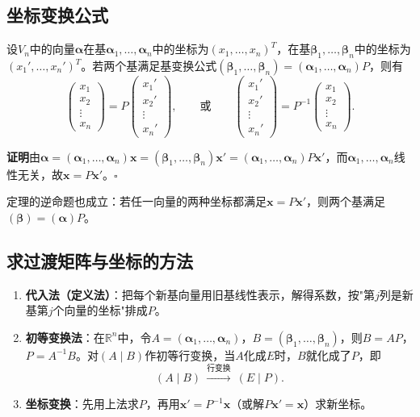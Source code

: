 \subsection{坐标变换公式}
\begin{theorem}[坐标变换公式]
设$V_n$中的向量$\boldsymbol{\alpha}$在基$\boldsymbol{\alpha}_1,\dots,\boldsymbol{\alpha}_n$中的坐标为$(x_1,\dots,x_n)^{T}$，在基$\boldsymbol{\beta}_1,\dots,\boldsymbol{\beta}_n$中的坐标为$(x_1',\dots,x_n')^{T}$。若两个基满足基变换公式$(\boldsymbol{\beta}_1,\dots,\boldsymbol{\beta}_n)=(\boldsymbol{\alpha}_1,\dots,\boldsymbol{\alpha}_n)P$，则有
\[
\begin{pmatrix}x_1\\x_2\\\vdots\\x_n\end{pmatrix}
=P\begin{pmatrix}x_1'\\x_2'\\\vdots\\x_n'\end{pmatrix},
\qquad\text{或}\qquad
\begin{pmatrix}x_1'\\x_2'\\\vdots\\x_n'\end{pmatrix}
=P^{-1}\begin{pmatrix}x_1\\x_2\\\vdots\\x_n\end{pmatrix}.
\]
\end{theorem}

\textbf{证明}\quad 由$\boldsymbol{\alpha}=(\boldsymbol{\alpha}_1,\dots,\boldsymbol{\alpha}_n)\boldsymbol{x}=(\boldsymbol{\beta}_1,\dots,\boldsymbol{\beta}_n)\boldsymbol{x}'=(\boldsymbol{\alpha}_1,\dots,\boldsymbol{\alpha}_n)P\boldsymbol{x}'$，而$\boldsymbol{\alpha}_1,\dots,\boldsymbol{\alpha}_n$线性无关，故$\boldsymbol{x}=P\boldsymbol{x}'$。\hfill$\square$

定理的逆命题也成立：若任一向量的两种坐标都满足$\boldsymbol{x}=P\boldsymbol{x}'$，则两个基满足$(\boldsymbol{\beta})=(\boldsymbol{\alpha})P$。

\subsection{求过渡矩阵与坐标的方法}
\begin{enumerate}
    \item \textbf{代入法（定义法）}：把每个新基向量用旧基线性表示，解得系数，按"第$j$列是新基第$j$个向量的坐标"排成$P$。
    \item \textbf{初等变换法}：在$\mathbb{R}^{n}$中，令$A=(\boldsymbol{\alpha}_1,\dots,\boldsymbol{\alpha}_n)$，$B=(\boldsymbol{\beta}_1,\dots,\boldsymbol{\beta}_n)$，则$B=AP$，$P=A^{-1}B$。对$(A\mid B)$作初等行变换，当$A$化成$E$时，$B$就化成了$P$，即
    \[
    (A\mid B)\ \xrightarrow{\text{行变换}}\ (E\mid P).
    \]
    \item \textbf{坐标变换}：先用上法求$P$，再用$\boldsymbol{x}'=P^{-1}\boldsymbol{x}$（或解$P\boldsymbol{x}'=\boldsymbol{x}$）求新坐标。
\end{enumerate}

